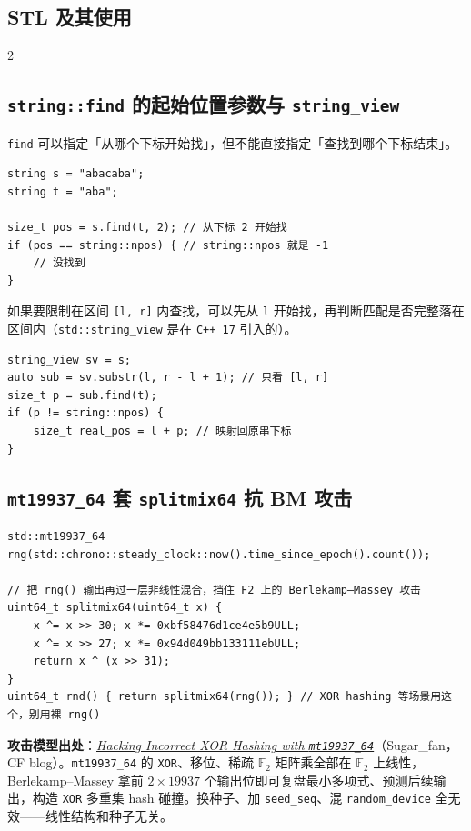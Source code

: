 	\begin{center}
		\section{STL 及其使用}
	\end{center}

	\begin{multicols*}{2}

		\subsection{\texttt{string::find} 的起始位置参数与 \texttt{string\_view}}
		\texttt{find} 可以指定「从哪个下标开始找」，但不能直接指定「查找到哪个下标结束」。

		\begin{verbatim}
string s = "abacaba";
string t = "aba";

size_t pos = s.find(t, 2); // 从下标 2 开始找
if (pos == string::npos) { // string::npos 就是 -1
	// 没找到
}
		\end{verbatim}

		如果要限制在区间 \verb|[l, r]| 内查找，可以先从 \verb|l| 开始找，再判断匹配是否完整落在区间内（\verb|std::string_view| 是在 \verb|C++ 17| 引入的）。

		\begin{verbatim}
string_view sv = s;
auto sub = sv.substr(l, r - l + 1); // 只看 [l, r]
size_t p = sub.find(t);
if (p != string::npos) {
	size_t real_pos = l + p; // 映射回原串下标
}
		\end{verbatim}

		\subsection{\texttt{mt19937\_64} 套 \texttt{splitmix64} 抗 BM 攻击}

		\begin{verbatim}
std::mt19937_64 rng(std::chrono::steady_clock::now().time_since_epoch().count());

// 把 rng() 输出再过一层非线性混合，挡住 F2 上的 Berlekamp–Massey 攻击
uint64_t splitmix64(uint64_t x) {
	x ^= x >> 30; x *= 0xbf58476d1ce4e5b9ULL;
	x ^= x >> 27; x *= 0x94d049bb133111ebULL;
	return x ^ (x >> 31);
}
uint64_t rnd() { return splitmix64(rng()); } // XOR hashing 等场景用这个，别用裸 rng()
		\end{verbatim}

		\textbf{攻击模型出处}：\href{https://codeforces.com/blog/entry/153335}{\textit{Hacking Incorrect XOR Hashing with \texttt{mt19937\_64}}}（Sugar\_fan，CF blog）。\texttt{mt19937\_64} 的 \texttt{XOR}、移位、稀疏 $\mathbb{F}_2$ 矩阵乘全部在 $\mathbb{F}_2$ 上线性，Berlekamp–Massey 拿前 $2 \times 19937$ 个输出位即可复盘最小多项式、预测后续输出，构造 \texttt{XOR} 多重集 hash 碰撞。换种子、加 \texttt{seed\_seq}、混 \texttt{random\_device} 全无效——线性结构和种子无关。


\end{multicols*}
